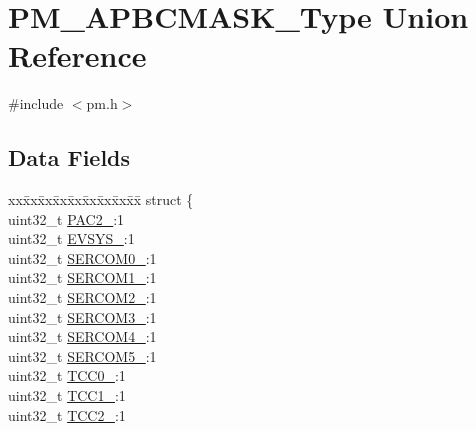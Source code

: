 \hypertarget{union_p_m___a_p_b_c_m_a_s_k___type}{}\section{P\+M\+\_\+\+A\+P\+B\+C\+M\+A\+S\+K\+\_\+\+Type Union Reference}
\label{union_p_m___a_p_b_c_m_a_s_k___type}


{\ttfamily \#include $<$pm.\+h$>$}

\subsection*{Data Fields}
\begin{DoxyCompactItemize}
\item 
\begin{tabbing}
xx\=xx\=xx\=xx\=xx\=xx\=xx\=xx\=xx\=\kill
struct \{\\
\>uint32\_t \mbox{\hyperlink{union_p_m___a_p_b_c_m_a_s_k___type_aa7960bc608c96b80eb26282d089a0e16}{PAC2\_}}:1\\
\>uint32\_t \mbox{\hyperlink{union_p_m___a_p_b_c_m_a_s_k___type_a986c1b4829e0f41b25a30a9eb0b97646}{EVSYS\_}}:1\\
\>uint32\_t \mbox{\hyperlink{union_p_m___a_p_b_c_m_a_s_k___type_a7f752e2a4aea341fc1c4527dec0331c8}{SERCOM0\_}}:1\\
\>uint32\_t \mbox{\hyperlink{union_p_m___a_p_b_c_m_a_s_k___type_a35d4d200a2fca19dafb79e160cb9cfe4}{SERCOM1\_}}:1\\
\>uint32\_t \mbox{\hyperlink{union_p_m___a_p_b_c_m_a_s_k___type_a9f690b6ba4218c30e75df7da4b973a4c}{SERCOM2\_}}:1\\
\>uint32\_t \mbox{\hyperlink{union_p_m___a_p_b_c_m_a_s_k___type_ac1a45a02b28ed73cf4c26f7e65c051ba}{SERCOM3\_}}:1\\
\>uint32\_t \mbox{\hyperlink{union_p_m___a_p_b_c_m_a_s_k___type_ad871ba6ef8c9fff3341a68764dcd8ba4}{SERCOM4\_}}:1\\
\>uint32\_t \mbox{\hyperlink{union_p_m___a_p_b_c_m_a_s_k___type_a19cb7399f5a37ca19f59c1c61957ed6f}{SERCOM5\_}}:1\\
\>uint32\_t \mbox{\hyperlink{union_p_m___a_p_b_c_m_a_s_k___type_a5d772bb5f5feb51aa287bbe308964404}{TCC0\_}}:1\\
\>uint32\_t \mbox{\hyperlink{union_p_m___a_p_b_c_m_a_s_k___type_aaf23cacf1ec80847e7cfb6e6e7c28fe8}{TCC1\_}}:1\\
\>uint32\_t \mbox{\hyperlink{union_p_m___a_p_b_c_m_a_s_k___type_a78a459cadc229c32542b9b9f096a29e8}{TCC2\_}}:1\\

\end{tabbing}
\end{DoxyCompactItemize}
